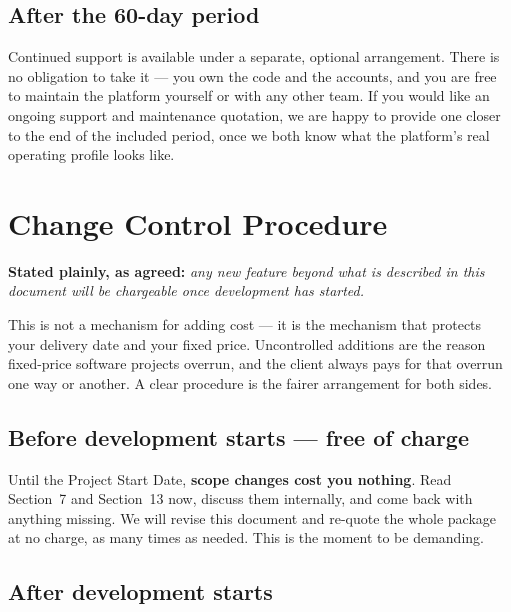 \documentclass[11pt,a4paper]{article}
\begin{document}
\subsection{After the 60-day period}

Continued support is available under a separate, optional arrangement. There is no
obligation to take it --- you own the code and the accounts, and you are free to
maintain the platform yourself or with any other team. If you would like an ongoing
support and maintenance quotation, we are happy to provide one closer to the end of the
included period, once we both know what the platform's real operating profile looks like.

\clearpage

\section{Change Control Procedure}

\begin{accentbox}
\textbf{Stated plainly, as agreed:} \emph{any new feature beyond what is described in
this document will be chargeable once development has started.}
\end{accentbox}

This is not a mechanism for adding cost --- it is the mechanism that protects your
delivery date and your fixed price. Uncontrolled additions are the reason fixed-price
software projects overrun, and the client always pays for that overrun one way or
another. A clear procedure is the fairer arrangement for both sides.

\subsection{Before development starts --- free of charge}

Until the Project Start Date, \textbf{scope changes cost you nothing}. Read Section~7 and
Section~13 now, discuss them internally, and come back with anything missing. We will
revise this document and re-quote the whole package at no charge, as many times as
needed. This is the moment to be demanding.

\subsection{After development starts}
\end{document}
